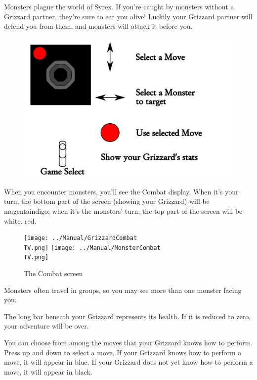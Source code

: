 \documentclass[10pt,twocolumn,openany,article]{memoir}
\newcommand\TV{NTSC}
\newcommand\TV{PAL}
\newcommand\TV{SECAM}
\begin{document}
Monsters plague the world of Syrex. If you're caught by monsters without
a Grizzard partner, they're sure to eat you alive! Luckily your Grizzard
partner  will  defend  you  from  them,  and  monsters  will  attack  it
before you.

\begin{figure}[ht]
  \includegraphics[width=2\columnwidth]{../Manual/CombatControls.png}
\end{figure}

When you  encounter monsters, you'll  see the Combat display.  When it's
your turn, the bottom part of the screen (showing your Grizzard) will be
\ifdefined\TVSECAM magenta\else indigo\fi{}; when it's the monsters' turn,
the top part of the screen will be \ifdefined\TVSECAM white. \else red. \fi

\begin{figure}[b]
  \texttt{[image: ../Manual/GrizzardCombat\\TV.png]}
  \vfill
  \texttt{[image: ../Manual/MonsterCombat\\TV.png]}
  \caption{The Combat screen}
\end{figure}

Monsters often  travel in groups, so  you may see more  than one monster
facing you.

The  long bar  beneath your  Grizzard represents  its health.  If it  is
reduced to zero, your adventure will be over.

You can  choose from  among the  moves that your  Grizzard knows  how to
perform. Press up and down to select  a move. If your Grizzard knows how
to perform a move, it will appear in blue. If your Grizzard does not yet
know how to perform a move, it will appear in black.
\end{document}
